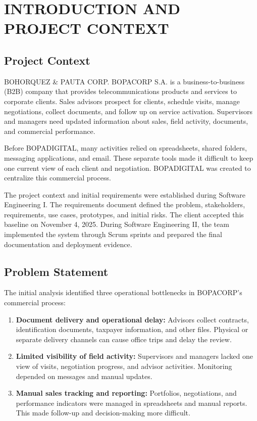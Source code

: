\documentclass[letterpaper%
, oneside%
, 12pt%
, memoireprojet%
, english%
,creativecommons,hyperref, withAlgo2e %
]{thETS}
\begin{document}
\cleardoublepage
{}
\reversemarginpar

\chapter{INTRODUCTION AND PROJECT CONTEXT}

\section{Project Context}
BOHORQUEZ \& PAUTA CORP. BOPACORP S.A. is a business-to-business (B2B) company that provides telecommunications products and services to corporate clients. Sales advisors prospect for clients, schedule visits, manage negotiations, collect documents, and follow up on service activation. Supervisors and managers need updated information about sales, field activity, documents, and commercial performance.

Before BOPADIGITAL, many activities relied on spreadsheets, shared folders, messaging applications, and email. These separate tools made it difficult to keep one current view of each client and negotiation. BOPADIGITAL was created to centralize this commercial process.

The project context and initial requirements were established during Software Engineering I. The requirements document defined the problem, stakeholders, requirements, use cases, prototypes, and initial risks. The client accepted this baseline on November 4, 2025. During Software Engineering II, the team implemented the system through Scrum sprints and prepared the final documentation and deployment evidence.

\section{Problem Statement}
The initial analysis identified three operational bottlenecks in BOPACORP's commercial process:

\begin{enumerate}
    \item \textbf{Document delivery and operational delay:} Advisors collect contracts, identification documents, taxpayer information, and other files. Physical or separate delivery channels can cause office trips and delay the review.
    \item \textbf{Limited visibility of field activity:} Supervisors and managers lacked one view of visits, negotiation progress, and advisor activities. Monitoring depended on messages and manual updates.
    \item \textbf{Manual sales tracking and reporting:} Portfolios, negotiations, and performance indicators were managed in spreadsheets and manual reports. This made follow-up and decision-making more difficult.
\end{enumerate}
\end{document}
